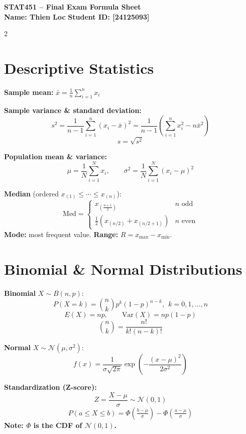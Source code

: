 \documentclass[9pt,a4paper]{extarticle}
\newcommand{\sh}[1]{\textbf{\color{BrickRed} #1}}
\newcommand{\studentname}{Thien Loc}
\newcommand{\studentid}{[24125093]}
\begin{document}
\small

\begin{center}
\textbf{\large STAT451 -- Final Exam Formula Sheet} \\[-1pt]
\textbf{Name: \studentname} \hspace{2cm} \textbf{Student ID: \studentid}
\end{center}
\vspace{-8pt}

\begin{multicols*}{2}

\section{Descriptive Statistics}

\sh{Sample mean:} $\displaystyle \bar{x}=\frac{1}{n}\sum_{i=1}^{n}x_i$

\sh{Sample variance \& standard deviation:}
\[
s^{2}=\frac{1}{n-1}\sum_{i=1}^{n}(x_i-\bar{x})^{2}
     =\frac{1}{n-1}\!\left(\sum_{i=1}^{n}x_i^{2}-n\bar{x}^{2}\right)
\]
\[
s=\sqrt{s^{2}}
\]

\sh{Population mean \& variance:}
\[
\mu=\frac{1}{N}\sum_{i=1}^{N}x_i,\qquad
\sigma^{2}=\frac{1}{N}\sum_{i=1}^{N}(x_i-\mu)^{2}
\]

\sh{Median} (ordered $x_{(1)}\!\le\!\cdots\!\le\! x_{(n)}$):
\[
\mathrm{Med}=
\begin{cases}
x_{\left(\frac{n+1}{2}\right)} & n\text{ odd}\\[2pt]
\tfrac{1}{2}\!\left(x_{(n/2)}+x_{(n/2+1)}\right) & n\text{ even}
\end{cases}
\]
\sh{Mode:} most frequent value. \sh{Range:} $R=x_{\max}-x_{\min}$.

\section{Binomial \& Normal Distributions}

\sh{Binomial} $X\sim B(n,p)$:
\[
P(X=k)=\binom{n}{k}p^{k}(1-p)^{n-k},\ \ k=0,1,\dots,n
\]
\[
E(X)=np,\qquad \mathrm{Var}(X)=np(1-p)
\]
\[
\binom{n}{k}=\frac{n!}{k!(n-k)!}
\]

\sh{Normal} $X\sim \mathcal{N}(\mu,\sigma^{2})$:
\[
f(x)=\frac{1}{\sigma\sqrt{2\pi}}\exp\!\left(-\frac{(x-\mu)^{2}}{2\sigma^{2}}\right)
\]

\sh{Standardization (Z-score):}
\[
Z=\frac{X-\mu}{\sigma}\sim \mathcal{N}(0,1)
\]
\[
P(a\le X\le b)=\Phi\!\left(\tfrac{b-\mu}{\sigma}\right)-\Phi\!\left(\tfrac{a-\mu}{\sigma}\right)
\]
\textbf{Note: $\Phi$ is the CDF of $\mathcal{N}(0,1)$.}


\end{multicols*}
\end{document}
